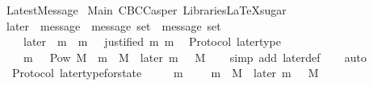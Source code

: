 %
\begin{isabellebody}%
%
%
\isadelimdocument
%
\endisadelimdocument
%
\isatagdocument
%
\isamarkuptrue%
%
\endisatagdocument
{\isafolddocument}%
%
\isadelimdocument
%
\endisadelimdocument
%
\isadelimtheory
%
\endisadelimtheory
%
\isatagtheory
{}\isamarkupfalse%
\ LatestMessage\isanewline
\isanewline
{}\ Main\ CBCCasper\ {\isachardoublequoteopen}Libraries{\isacharslash}LaTeXsugar{\isachardoublequoteclose}\isanewline
\isanewline
{}%
\endisatagtheory
{\isafoldtheory}%
%
\isadelimtheory
\isanewline
%
\endisadelimtheory
\isanewline
\isanewline
\isanewline
\isanewline
\isanewline
\isanewline
\isanewline
\isanewline
{}\isamarkupfalse%
\ later\ {\isacharcolon}{\isacharcolon}\ {\isachardoublequoteopen}{\isacharparenleft}message\ {\isacharasterisk}\ message\ set{\isacharparenright}\ {\isasymRightarrow}\ message\ set{\isachardoublequoteclose}\isanewline
\ \ \isanewline
\ \ \ \ {\isachardoublequoteopen}later\ {\isacharequal}\ {\isacharparenleft}{\isasymlambda}{\isacharparenleft}m{\isacharcomma}\ {\isasymsigma}{\isacharparenright}{\isachardot}\ {\isacharbraceleft}m{\isacharprime}\ {\isasymin}\ {\isasymsigma}{\isachardot}\ justified\ m\ m{\isacharprime}{\isacharbraceright}{\isacharparenright}{\isachardoublequoteclose}\isanewline
\isanewline
{}\isamarkupfalse%
\ {\isacharparenleft}\ Protocol{\isacharparenright}\ later{\isacharunderscore}type\ {\isacharcolon}\isanewline
\ \ {\isachardoublequoteopen}{\isasymforall}\ {\isasymsigma}\ m{\isachardot}\ {\isasymsigma}\ {\isasymin}\ Pow\ M\ {\isasymand}\ m\ {\isasymin}\ M\ {\isasymlongrightarrow}\ later\ {\isacharparenleft}m{\isacharcomma}\ {\isasymsigma}{\isacharparenright}\ {\isasymsubseteq}\ M{\isachardoublequoteclose}\isanewline
%
\isadelimproof
\ \ %
\endisadelimproof
%
\isatagproof
{}\isamarkupfalse%
\ {\isacharparenleft}simp\ add{\isacharcolon}\ later{\isacharunderscore}def{\isacharparenright}\isanewline
\ \ \isamarkupfalse%
\ auto%
\endisatagproof
{\isafoldproof}%
%
\isadelimproof
\isanewline
%
\endisadelimproof
\isanewline
{}\isamarkupfalse%
\ {\isacharparenleft}\ Protocol{\isacharparenright}\ later{\isacharunderscore}type{\isacharunderscore}for{\isacharunderscore}state\ {\isacharcolon}\isanewline
\ \ {\isachardoublequoteopen}{\isasymforall}\ {\isasymsigma}\ m{\isachardot}\ {\isasymsigma}\ {\isasymin}\ {\isasymSigma}\ {\isasymand}\ m\ {\isasymin}\ M\ {\isasymlongrightarrow}\ later\ {\isacharparenleft}m{\isacharcomma}\ {\isasymsigma}{\isacharparenright}\ {\isasymsubseteq}\ M{\isachardoublequoteclose}\isanewline

\end{isabellebody}
